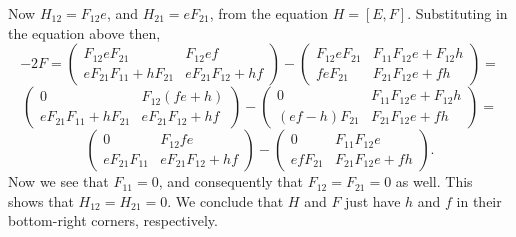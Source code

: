 \documentclass[12pt,psamsfonts]{article}
\begin{document}
Now \(H_{12} = F_{12}e\), and \(H_{21} = eF_{21}\), from the equation \(H = [E, F]\).
Substituting in the equation above then,
\[-2F = \begin{pmatrix}
    F_{12} e F_{21} & F_{12}e f \\
    eF_{21} F_{11} + h F_{21} & eF_{21} F_{12} + hf
\end{pmatrix} - \begin{pmatrix}
    F_{12} e F_{21} & F_{11} F_{12}e + F_{12} h \\
    f eF_{21} & F_{21} F_{12}e + fh
\end{pmatrix} =\]
\[\begin{pmatrix}
    0 & F_{12}(fe + h) \\
    eF_{21} F_{11} + h F_{21} & eF_{21} F_{12} + hf
\end{pmatrix} - \begin{pmatrix}
    0 & F_{11} F_{12}e + F_{12} h \\
    (ef - h)F_{21} & F_{21} F_{12}e + fh
\end{pmatrix} =\]
\[\begin{pmatrix}
    0 & F_{12}fe \\
    eF_{21} F_{11} & eF_{21} F_{12} + hf
\end{pmatrix} - \begin{pmatrix}
    0 & F_{11} F_{12}e \\
    ef F_{21} & F_{21} F_{12}e + fh
\end{pmatrix}.\]
Now we see that \(F_{11} = 0\), and consequently that \(F_{12} = F_{21} = 0\) as well.
This shows that \(H_{12} = H_{21} = 0\).
We conclude that \(H\) and \(F\) just have \(h\) and \(f\) in their bottom-right corners, respectively.
\end{document}
